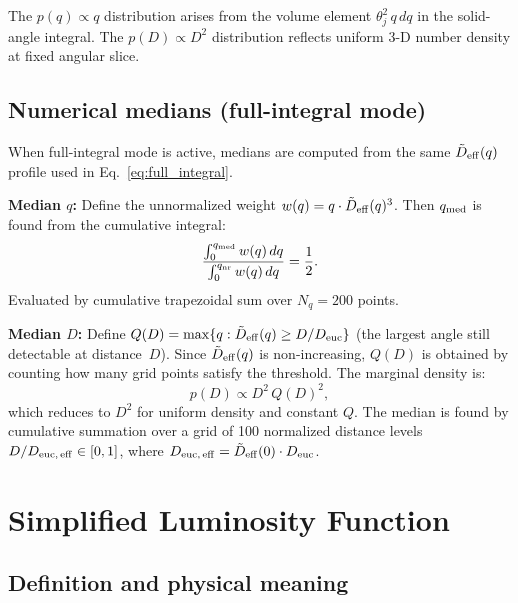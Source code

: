 \documentclass[11pt,a4paper]{article}
\begin{document}
\noindent The $p(q)\propto q$ distribution arises from the volume element $\theta_j^2\,q\,dq$ in the solid-angle integral. The $p(D)\propto D^2$ distribution reflects uniform 3-D number density at fixed angular slice.

\subsection{Numerical medians (full-integral mode)}

When full-integral mode is active, medians are computed from the same $\tilde{D}_{\rm eff}(q)$ profile used in Eq.~\eqref{eq:full_integral}.

\medskip\noindent\textbf{Median $q$:}
Define the unnormalized weight $w(q)=q\cdot\tilde{D}_{\rm eff}(q)^3$. Then $q_{\rm med}$ is found from the cumulative integral:
\begin{equation}
\frac{\int_0^{q_{\rm med}} w(q)\,dq}{\int_0^{q_{\rm nr}} w(q)\,dq} = \frac{1}{2}.
\end{equation}
Evaluated by cumulative trapezoidal sum over $N_q=200$ points.

\medskip\noindent\textbf{Median $D$:}
Define $Q(D)=\max\{q:\tilde{D}_{\rm eff}(q)\ge D/D_{\rm euc}\}$ (the largest angle still detectable at distance~$D$). Since $\tilde{D}_{\rm eff}(q)$ is non-increasing, $Q(D)$ is obtained by counting how many grid points satisfy the threshold. The marginal density is:
\begin{equation}
p(D)\propto D^2\,Q(D)^2,
\end{equation}
which reduces to $D^2$ for uniform density and constant $Q$. The median is found by cumulative summation over a grid of 100 normalized distance levels $D/D_{\rm euc,\,eff}\in[0,1]$, where $D_{\rm euc,\,eff}=\tilde{D}_{\rm eff}(0)\cdot D_{\rm euc}$.

\section{Simplified Luminosity Function}
\label{sec:lf}

\subsection{Definition and physical meaning}
\end{document}
